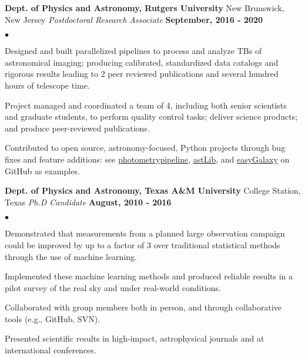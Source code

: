 \documentclass[margin,line, 11pt]{res}
\newenvironment{list2}{
  \begin{list}{$\bullet$}{%
      \setlength{\itemsep}{0in}
      \setlength{\parsep}{0in} \setlength{\parskip}{0in}
      \setlength{\topsep}{0in} \setlength{\partopsep}{0in}
      \setlength{\leftmargin}{0.2in}}}{\end{list}}
\begin{document}
\begin{resume}
\textbf{Dept. of Physics and Astronomy, Rutgers University} \hfill New Brunswick, New Jersey\newline
\textit{Postdoctoral Research Associate} \hfill \textbf{September, 2016 - 2020}\newline
    \begin{list2}
    	\vspace*{-5mm}
    	\item Designed and built parallelized pipelines to process and analyze TBs of astronomical imaging; producing calibrated, standardized data catalogs and rigorous results leading to 2 peer reviewed publications and several hundred hours of telescope time.
    	\item Project managed and coordinated a team of 4, including both senior scientists and graduate students,
      to perform quality control tasks; deliver science products; and produce peer-reviewed publications.
    	\item Contributed to open source, astronomy-focused, Python projects through bug fixes and feature additions: see \href{https://github.com/boada/photometrypipeline}{photometrypipeline}, \href{http://astlib.sourceforge.net/}{astLib}, and \href{https://github.com/boada/easyGalaxy}{easyGalaxy} on GitHub as examples.
    \end{list2}
\vspace*{-2mm}

\textbf{Dept. of Physics and Astronomy, Texas A\&M University} \hfill College Station, Texas\newline
\textit{Ph.D Candidate} \hfill \textbf{August, 2010 - 2016}\newline
    \begin{list2}
    	\vspace*{-5mm}
      \item Demonstrated that measurements from a planned large observation campaign could be improved by up to a factor of 3 over traditional statistical methods through the use of machine learning.
      \item Implemented these machine learning methods and produced reliable results in a pilot survey of the real sky and under real-world conditions.
    	\item Collaborated with group members both in person, and through collaborative tools (e.g., GitHub, SVN).
    	\item Presented scientific results in high-impact, astrophysical journals and at international conferences.
    \end{list2}
\vspace*{-2mm}


\end{resume}
\end{document}
